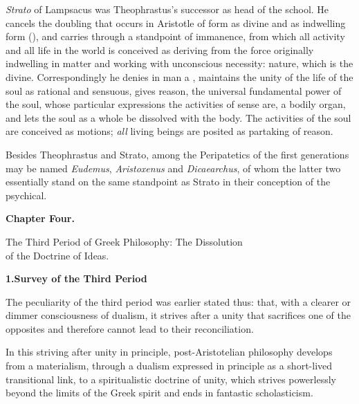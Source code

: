 \emph{Strato} of Lampsacus was Theophrastus's successor
as head of the school. He cancels the doubling that occurs in
Aristotle of form as divine 
 and as indwelling form (), and carries through a
standpoint of immanence, from which all activity and all life in
the world is conceived as deriving from the force originally indwelling in matter and working with unconscious necessity: nature,
which is the divine. Correspondingly he denies
in man a , maintains the unity of the life of the soul
as rational and sensuous, gives reason, the universal
fundamental power of the soul, whose particular expressions the activities of sense are,
a bodily organ, and lets the soul as a whole be dissolved with
the body. The activities of the soul are conceived as motions; \emph{all}
living beings are posited as partaking of reason.

Besides Theophrastus and Strato, among the Peripatetics of the first generations may be named \emph{Eudemus}, \emph{Aristoxenus} and \emph{Dicaearchus}, of whom the latter two essentially stand on the same standpoint
as Strato in their conception of the psychical.

\divrule

 \setcounter{footnote}{0}

\begin{center}
{\Large\textbf{Chapter Four.}}
\end{center}

\divrule

\begin{center}
{\Large The Third Period of Greek Philosophy: The Dissolution\\
of the Doctrine of Ideas.}
\end{center}

\divrule

\begin{center}
\textbf{1.\enspace Survey of the Third Period}
\end{center}

The peculiarity of the third period was earlier stated thus: that, with a
clearer or dimmer consciousness of dualism, it strives after a unity that
sacrifices one of the opposites and therefore cannot lead to their
reconciliation.

In this striving after unity in principle, post-Aristotelian philosophy
develops from a materialism, through a dualism expressed in principle as a
short-lived transitional link, to a spiritualistic doctrine of unity, which
strives powerlessly beyond the limits of the Greek spirit and ends in
fantastic scholasticism.

